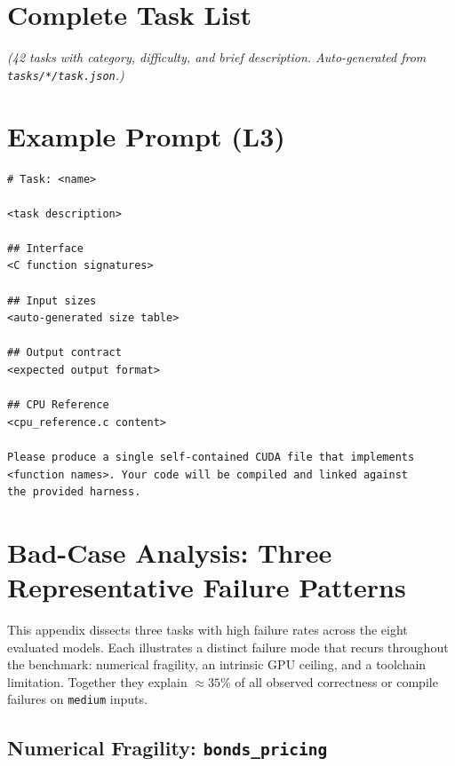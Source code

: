 \documentclass{article}
\begin{document}

\appendix

\section{Complete Task List}
\label{app:tasklist}

\emph{(42 tasks with category, difficulty, and brief description.
Auto-generated from \texttt{tasks/*/task.json}.)}

\section{Example Prompt (L3)}
\label{app:prompt}

\begin{lstlisting}[style=cuda,caption={Canonical L3 prompt structure.}]
# Task: <name>

<task description>

## Interface
<C function signatures>

## Input sizes
<auto-generated size table>

## Output contract
<expected output format>

## CPU Reference
<cpu_reference.c content>

Please produce a single self-contained CUDA file that implements
<function names>. Your code will be compiled and linked against
the provided harness.
\end{lstlisting}


\section{Bad-Case Analysis: Three Representative Failure Patterns}
\label{app:badcases}

This appendix dissects three tasks with high failure rates across
the eight evaluated models. Each illustrates a distinct failure mode
that recurs throughout the benchmark: numerical fragility, an
intrinsic GPU ceiling, and a toolchain limitation. Together they
explain $\approx 35\%$ of all observed correctness or compile failures
on \texttt{medium} inputs.

\subsection{Numerical Fragility: \texttt{bonds\_pricing}}
\label{app:badcase-bonds}
\end{document}
